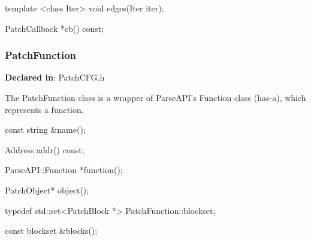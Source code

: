 \begin{apient}
template <class Iter>
void edges(Iter iter);
\end{apient}



\begin{apient}
PatchCallback *cb() const;
\end{apient}



\subsubsection{PatchFunction}
\label{sec-3.2.9}

\textbf{Declared in}: PatchCFG.h

The PatchFunction class is a wrapper of ParseAPI's Function class (has-a), which
represents a function.


\begin{apient}
const string &name();
\end{apient}



\begin{apient}
Address addr() const;
\end{apient}



\begin{apient}
ParseAPI::Function *function();
\end{apient}




\begin{apient}
PatchObject* object();
\end{apient}


\begin{apient}
typedef std::set<PatchBlock *> PatchFunction::blockset;

const blockset &blocks();
\end{apient}



